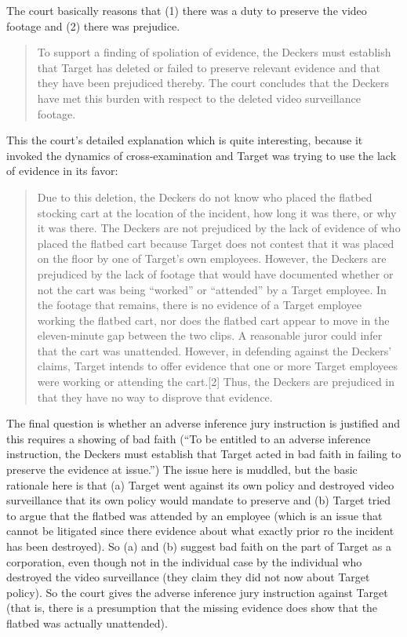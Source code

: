 \documentclass[
  10pt,
  dvipsnames,enabledeprecatedfontcommands]{scrartcl}
\begin{document}
The court basically reasons that (1) there was a duty to preserve the
video footage and (2) there was prejudice.

\begin{quote}
To support a finding of spoliation of evidence, the Deckers must establish that Target has deleted or failed to preserve relevant evidence and that they have been prejudiced thereby. The court concludes that the
Deckers have met this burden with respect to the deleted video surveillance footage.
\end{quote}

This the court's detailed explanation which is quite interesting,
because it invoked the dynamics of cross-examination and Target was
trying to use the lack of evidence in its favor:

\begin{quote}
Due to this deletion, the Deckers do not know who placed the flatbed stocking cart at the location of the
incident, how long it was there, or why it was there. The Deckers are not prejudiced by the lack of evidence of who placed the flatbed cart because Target does not contest that it was placed on the floor by one of Target’s own employees. However, the Deckers are prejudiced by the lack of footage that would have documented  whether or not the cart was being “worked” or “attended” by a Target employee. In the footage that remains, there is no evidence of a Target employee working the flatbed cart, nor does the flatbed cart appear to move in the eleven-minute gap between the two clips. A reasonable juror could infer that the cart was unattended. However, in defending against the Deckers’ claims, Target intends to offer evidence that one or more Target employees were working or attending the cart.[2] Thus, the Deckers are prejudiced in that they have no way to disprove that evidence.
\end{quote}

The final question is whether an adverse inference jury instruction is
justified and this requires a showing of bad faith (``To be entitled to
an adverse inference instruction, the Deckers must establish that Target
acted in bad faith in failing to preserve the evidence at issue.'') The
issue here is muddled, but the basic rationale here is that (a) Target
went against its own policy and destroyed video surveillance that its
own policy would mandate to preserve and (b) Target tried to argue that
the flatbed was attended by an employee (which is an issue that cannot
be litigated since there evidence about what exactly prior ro the
incident has been destroyed). So (a) and (b) suggest bad faith on the
part of Target as a corporation, even though not in the individual case
by the individual who destroyed the video surveillance (they claim they
did not now about Target policy). So the court gives the adverse
inference jury instruction against Target (that is, there is a
presumption that the missing evidence does show that the flatbed was
actually unattended).
\end{document}
